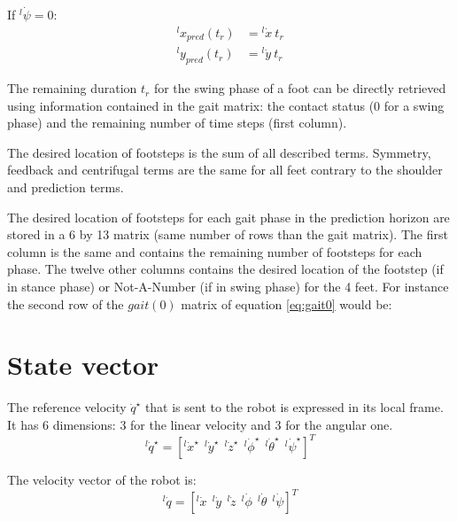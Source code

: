 \documentclass[a4paper,11pt]{article}
\begin{document}
If ${}^l\!\dot \psi = 0$:
\begin{align}
{}^l\!x_{pred}(t_r) &= {}^l\!\dot x ~ t_r \\
{}^l\!y_{pred}(t_r) &= {}^l\!\dot y ~ t_r
\end{align}

The remaining duration $t_r$ for the swing phase of a foot can be directly retrieved using information contained in the gait matrix: the contact status (0 for a swing phase) and the remaining number of time steps (first column).

The desired location of footsteps is the sum of all described terms. Symmetry, feedback and centrifugal terms are the same for all feet contrary to the shoulder and prediction terms.

The desired location of footsteps for each gait phase in the prediction horizon are stored in a 6 by 13 matrix (same number of rows than the gait matrix). The first column is the same and contains the remaining number of footsteps for each phase. The twelve other columns contains the desired location of the footstep (if in stance phase) or Not-A-Number (if in swing phase) for the 4 feet. For instance the second row of the $gait(0)$ matrix of equation \ref{eq:gait0} would be:
\begin{equation}
[ ~ 7 ~~ r_{x,0} ~~ r_{y,0} ~~ 0 ~~ \mathit{NaN} ~~ \mathit{NaN} ~~ \mathit{NaN} ~~ \mathit{NaN} ~~ \mathit{NaN} ~~ \mathit{NaN} ~~ r_{x,3} ~~ r_{y,3} ~~ 0 ~ ]
\end{equation}



\newpage
\section{State vector}


The reference velocity $\dot q^\star$ that is sent to the robot is expressed in its local frame. It has 6 dimensions: 3 for the linear velocity and 3 for the angular one.
\begin{equation}
{}^l\! \dot q^\star = [{}^l\! \dot x^\star ~~ {}^l\! \dot y^\star ~~ {}^l\! \dot z^\star ~~ {}^l\! \dot \phi^\star ~~ {}^l\! \dot \theta^\star ~~ {}^l\! \dot \psi^\star ]^T
\end{equation}

The velocity vector of the robot is:
\begin{equation}
{}^l\! \dot q = [{}^l\! \dot x ~~ {}^l\! \dot y ~~ {}^l\! \dot z ~~ {}^l\! \dot \phi ~~ {}^l\! \dot \theta ~~ {}^l\! \dot \psi ]^T
\end{equation}
\end{document}
